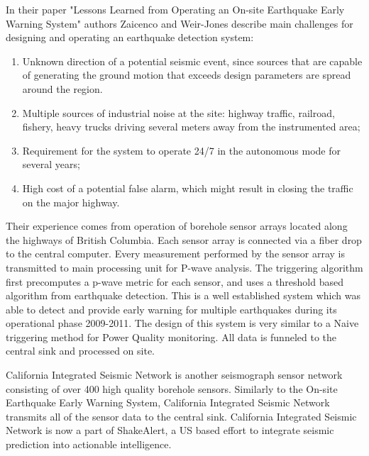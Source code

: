 In their paper "Lessons Learned from Operating an On-site Earthquake Early Warning System"\cite{zaicenco2012lessons} authors Zaicenco and Weir-Jones describe main challenges for designing and operating an earthquake detection system:
\begin{enumerate}
    \item Unknown direction of a potential seismic event, since sources that are capable of generating
    the ground motion that exceeds design parameters are spread around the region.
    \item Multiple sources of industrial noise at the site: highway traffic, railroad, fishery, heavy trucks
    driving several meters away from the instrumented area;
    \item Requirement for the system to operate 24/7 in the autonomous mode for several years;
    \item High cost of a potential false alarm, which might result in closing the traffic on the major
    highway.
\end{enumerate}

Their experience comes from operation of borehole sensor arrays located along the highways of British Columbia.
Each sensor array is connected via a fiber drop to the central computer.
Every measurement performed by the sensor array is transmitted to main processing unit for P-wave analysis.
The triggering algorithm first precomputes a p-wave metric for each sensor, and uses a threshold based algorithm from earthquake detection.
This is a well established system which was able to detect and provide early warning for multiple earthquakes during its operational phase 2009-2011.
The design of this system is very similar to a Naive triggering method for Power Quality monitoring.
All data is funneled to the central sink and processed on site.

California Integrated Seismic Network is another seismograph sensor network consisting of over 400 high quality borehole sensors.\cite{uhrhammer2011california}
Similarly to the On-site Earthquake Early Warning System, California Integrated Seismic Network transmits all of the sensor data to the central sink.
California Integrated Seismic Network is now a part of ShakeAlert, a US based effort to integrate seismic prediction into actionable intelligence.

